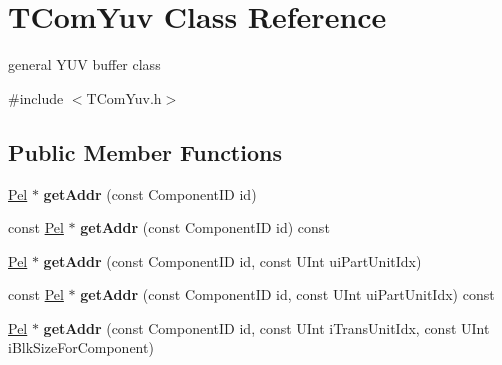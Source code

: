 \hypertarget{class_t_com_yuv}{}\section{T\+Com\+Yuv Class Reference}
\label{class_t_com_yuv}


general Y\+UV buffer class  




{\ttfamily \#include $<$T\+Com\+Yuv.\+h$>$}

\subsection*{Public Member Functions}
\begin{DoxyCompactItemize}
\item 
\mbox{\label{class_t_com_yuv_a4952a96c1ffe4e51573b4089f313bcdf}} 
\hyperlink{_type_def_8h_af92141699657699b4b547be0c8517541}{Pel} $\ast$ {\bfseries get\+Addr} (const Component\+ID id)
\item 
\mbox{\label{class_t_com_yuv_a663d349f056e772ccf82da03ae1caa0c}} 
const \hyperlink{_type_def_8h_af92141699657699b4b547be0c8517541}{Pel} $\ast$ {\bfseries get\+Addr} (const Component\+ID id) const
\item 
\mbox{\label{class_t_com_yuv_a492f6a0c1ff1f0fdfa163e814a5a0cb6}} 
\hyperlink{_type_def_8h_af92141699657699b4b547be0c8517541}{Pel} $\ast$ {\bfseries get\+Addr} (const Component\+ID id, const U\+Int ui\+Part\+Unit\+Idx)
\item 
\mbox{\label{class_t_com_yuv_ab7742aa3945d9481a203573dcb72689d}} 
const \hyperlink{_type_def_8h_af92141699657699b4b547be0c8517541}{Pel} $\ast$ {\bfseries get\+Addr} (const Component\+ID id, const U\+Int ui\+Part\+Unit\+Idx) const
\item 
\mbox{\label{class_t_com_yuv_a69952a8617d7a4c10775e466026e7dc9}} 
\hyperlink{_type_def_8h_af92141699657699b4b547be0c8517541}{Pel} $\ast$ {\bfseries get\+Addr} (const Component\+ID id, const U\+Int i\+Trans\+Unit\+Idx, const U\+Int i\+Blk\+Size\+For\+Component)
\item 
\mbox{\label{class_t_com_yuv_ad93c19cebd6c9445d1a2b71b6b89afef}} 

\end{DoxyCompactItemize}

